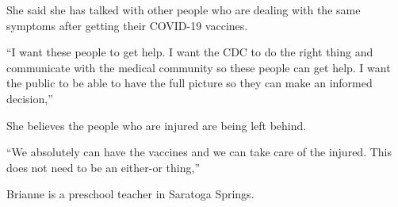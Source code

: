 {She said she has talked with other people who are dealing with the same symptoms
after getting their COVID-19 vaccines.

“I want these people to get help. I want the CDC to do the right thing and
communicate with the medical community so these people can get help. I want the
public to be able to have the full picture so they can make an informed
decision,”

She believes the people who are injured are being left behind.

“We absolutely can have the vaccines and we can take care of the injured. This
does not need to be an either-or thing,”

Brianne is a preschool teacher in Saratoga Springs.

}
